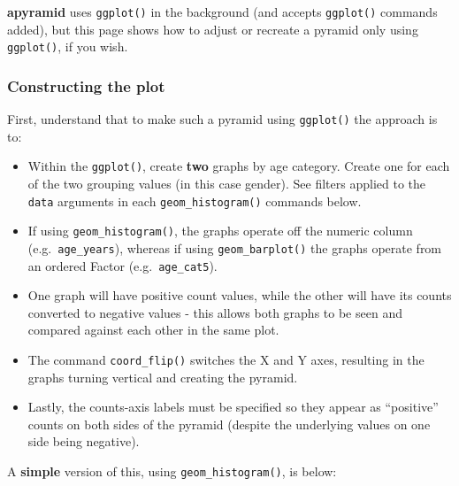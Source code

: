 \documentclass[
]{article}
\begin{document}
\textbf{apyramid} uses \texttt{ggplot()} in the background (and accepts
\texttt{ggplot()} commands added), but this page shows how to adjust or
recreate a pyramid only using \texttt{ggplot()}, if you wish.

\hypertarget{constructing-the-plot}{%
\subsubsection{Constructing the plot}\label{constructing-the-plot}}

First, understand that to make such a pyramid using \texttt{ggplot()}
the approach is to:

\begin{itemize}
\item
  Within the \texttt{ggplot()}, create \textbf{two} graphs by age
  category. Create one for each of the two grouping values (in this case
  gender). See filters applied to the \texttt{data} arguments in each
  \texttt{geom\_histogram()} commands below.
\item
  If using \texttt{geom\_histogram()}, the graphs operate off the
  numeric column (e.g.~\texttt{age\_years}), whereas if using
  \texttt{geom\_barplot()} the graphs operate from an ordered Factor
  (e.g.~\texttt{age\_cat5}).
\item
  One graph will have positive count values, while the other will have
  its counts converted to negative values - this allows both graphs to
  be seen and compared against each other in the same plot.
\item
  The command \texttt{coord\_flip()} switches the X and Y axes,
  resulting in the graphs turning vertical and creating the pyramid.
\item
  Lastly, the counts-axis labels must be specified so they appear as
  ``positive'' counts on both sides of the pyramid (despite the
  underlying values on one side being negative).
\end{itemize}

A \textbf{simple} version of this, using \texttt{geom\_histogram()}, is
below:
\end{document}
